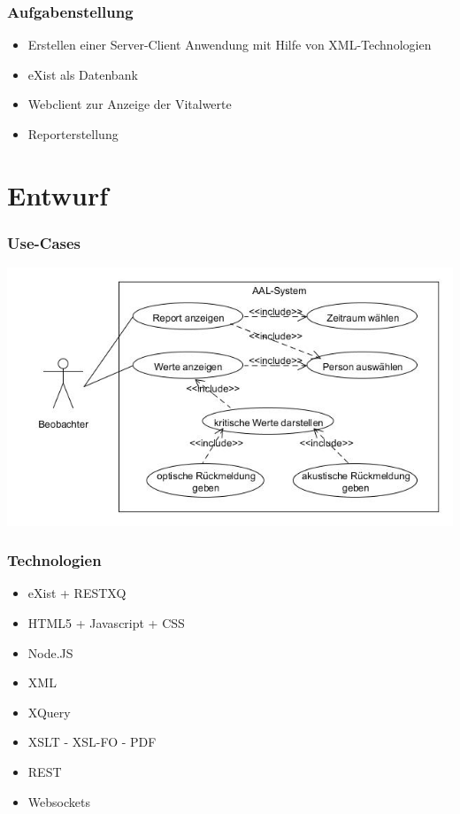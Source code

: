 \documentclass{beamer}
\begin{document}
\begin{frame}
\frametitle{Aufgabenstellung}
\begin{itemize}
	\item Erstellen einer Server-Client Anwendung mit Hilfe von XML-Technologien
	\item eXist als Datenbank
	\item Webclient zur Anzeige der Vitalwerte
	\item Reporterstellung
\end{itemize}
\end{frame}

\section{Entwurf}
\begin{frame}
\frametitle{Use-Cases}
\includegraphics[scale=0.5]{images/AAL-Use-Case-Diagramm.jpg} 
\end{frame}

\begin{frame}
\frametitle{Technologien}
\begin{itemize}
	\item eXist + RESTXQ
	\item HTML5 + Javascript + CSS
	\item Node.JS
	\item XML
	\item XQuery
	\item XSLT - XSL-FO - PDF
	\item REST
	\item Websockets
\end{itemize}
\end{frame}
\end{document}
